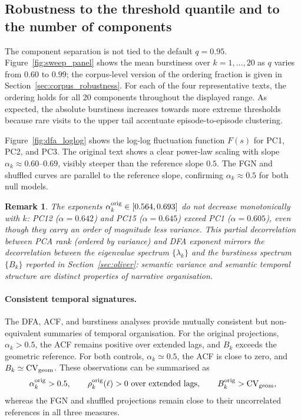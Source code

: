\documentclass[preprint]{elsarticle}
\newtheorem{remark}{Remark}
\newcommand{\CV}{\mathrm{CV}}
\begin{document}
\FloatBarrier
\subsection{Robustness to the threshold quantile and to the number of
components}
\label{sec:single_text_robustness}

The component separation is not tied to the default $q=0.95$.
Figure~\ref{fig:sweep_panel} shows the mean
burstiness over $k=1,\ldots,20$ as $q$ varies from $0.60$ to $0.99$;
the corpus-level version of the ordering fraction is given in
Section~\ref{sec:corpus_robustness}.
For each of the four representative texts, the ordering holds for all
20 components throughout the displayed range. As expected, the
absolute burstiness increases towards more extreme thresholds because
rare visits to the upper tail accentuate episode-to-episode clustering.



Figure~\ref{fig:dfa_loglog} shows the log-log fluctuation
function $F(s)$ for PC1, PC2, and PC3.
The original text shows a clear power-law scaling with
slope $\alpha_k \approx 0.60$--$0.69$, visibly steeper than
the reference slope $0.5$.
The FGN and shuffled curves are parallel to the reference slope,
confirming $\alpha_k \approx 0.5$ for both null models.

\begin{remark}
  The exponents $\alpha_k^{\rm orig} \in [0.564, 0.693]$ do not
  decrease monotonically with $k$: PC12 ($\alpha=0.642$) and PC15
  ($\alpha=0.645$) exceed PC1 ($\alpha=0.605$), even though they carry
  an order of magnitude less variance.
  This partial decorrelation between PCA rank (ordered by variance) and
  DFA exponent mirrors the decorrelation between the eigenvalue
  spectrum $\{\lambda_k\}$ and the burstiness spectrum $\{B_k\}$
  reported in Section~\ref{sec:oliver}: semantic variance and semantic
  temporal structure are distinct properties of narrative
  organisation.
\end{remark}

\paragraph{Consistent temporal signatures.}
The DFA, ACF, and burstiness analyses provide mutually consistent but
non-equivalent summaries of temporal organisation. For the original
projections, $\alpha_k>0.5$, the ACF remains positive over extended
lags, and $B_k$ exceeds the geometric reference. For both controls,
$\alpha_k\simeq0.5$, the ACF is close to zero, and
$B_k\simeq\CV_{\rm geom}$. These observations can be summarised as
\begin{equation}
  \alpha_k^{\rm orig}>0.5,
  \qquad \rho_k^{\rm orig}(\ell)>0\ \text{over extended lags},
  \qquad B_k^{\rm orig}>\CV_{\rm geom},
  \label{eq:chain_numbers}
\end{equation}
whereas the FGN and shuffled projections remain close to their
uncorrelated references in all three measures.
\end{document}
